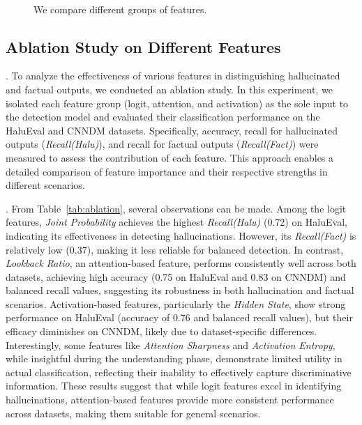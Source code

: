 
\begin{figure}
\centering
      \\
    \addtocounter{subfigure}{-1}
      \caption{
      We compare different groups of features.
      }
    \label{fig:detect_overall}
\end{figure}

\subsection{Ablation Study on Different Features}\label{sec:detect:ablation}

.
To analyze the effectiveness of various features in distinguishing hallucinated and factual outputs, we conducted an ablation study. In this experiment, we isolated each feature group (logit, attention, and activation) as the sole input to the detection model and evaluated their classification performance on the HaluEval and CNNDM datasets. Specifically, accuracy, recall for hallucinated outputs (\textit{Recall(Halu)}), and recall for factual outputs (\textit{Recall(Fact)}) were measured to assess the contribution of each feature. This approach enables a detailed comparison of feature importance and their respective strengths in different scenarios.

.
From Table~\ref{tab:ablation}, several observations can be made. Among the logit features, \textit{Joint Probability} achieves the highest \textit{Recall(Halu)} (0.72) on HaluEval, indicating its effectiveness in detecting hallucinations. However, its \textit{Recall(Fact)} is relatively low (0.37), making it less reliable for balanced detection. In contrast, \textit{Lookback Ratio}, an attention-based feature, performs consistently well across both datasets, achieving high accuracy (0.75 on HaluEval and 0.83 on CNNDM) and balanced recall values, suggesting its robustness in both hallucination and factual scenarios. Activation-based features, particularly the \textit{Hidden State}, show strong performance on HaluEval (accuracy of 0.76 and balanced recall values), but their efficacy diminishes on CNNDM, likely due to dataset-specific differences. Interestingly, some features like \textit{Attention Sharpness} and \textit{Activation Entropy}, while insightful during the understanding phase, demonstrate limited utility in actual classification, reflecting their inability to effectively capture discriminative information. These results suggest that while logit features excel in identifying hallucinations, attention-based features provide more consistent performance across datasets, making them suitable for general scenarios.

